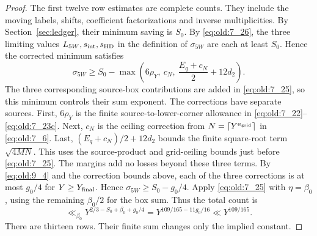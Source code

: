 \begin{proof}
The first twelve row estimates are complete counts. They include the
moving labels, shifts, coefficient factorizations and inverse
multiplicities. By Section~\ref{sec:ledger}, their minimum saving is
\(S_0\). By \eqref{eq:old:7_26}, the three limiting values
\(L_{5W},s_{\rm int},s_{\rm HD}\) in the definition of \(\sigma_{5W}\)
are each at least \(S_0\). Hence the corrected minimum satisfies
\[
 \sigma_{5W}\ge S_0-\max\!\left(6\rho_Y,\ c_N,\
       \frac{E_q+c_N}{2}+12d_2\right).
\]
The three corresponding source-box contributions are added in
\eqref{eq:old:7_25}, so this minimum controls their sum exponent.
The corrections have separate sources. First, \(6\rho_Y\) is the finite
source-to-lower-corner allowance in \eqref{eq:old:7_22}--\eqref{eq:old:7_23c}.
Next, \(c_N\) is the ceiling correction from \(N=\lceil Y^{a_{\rm grid}}\rceil\)
in \eqref{eq:old:7_6}. Last, \((E_q+c_N)/2+12d_2\) bounds the finite
square-root term \(\sqrt{4MN}\). This uses the source-product and
grid-ceiling bounds just before \eqref{eq:old:7_25}. The margins add no
losses beyond these three terms.
By \eqref{eq:old:9_4} and the correction bounds above, each of the three
corrections is at most \(g_0/4\) for \(Y\ge Y_{\rm final}\). Hence
\(\sigma_{5W}\ge S_0-g_0/4\). Apply \eqref{eq:old:7_25} with
\(\eta=\beta_0\), using the remaining \(\beta_0/2\) for the box sum.
Thus the total count is
\[
\ll_{\beta_0}
Y^{2/3-S_0+\beta_0+g_0/4}
=Y^{109/165-11g_0/16}\ll Y^{109/165}.
\]
There are thirteen rows. Their finite sum changes only the implied
constant.
\end{proof}
